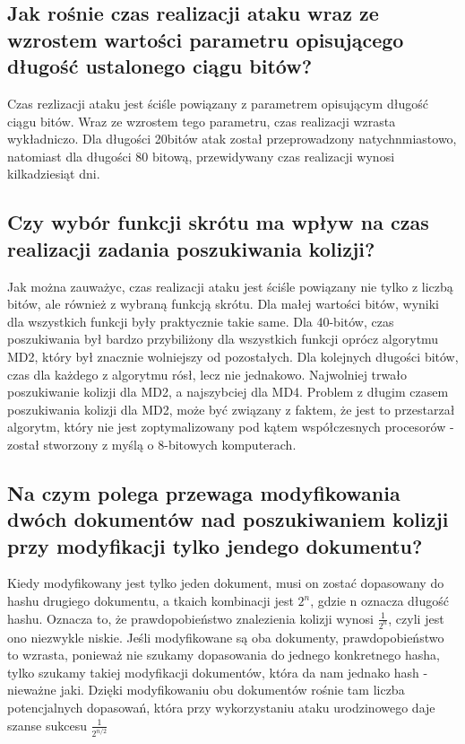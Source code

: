 \documentclass{article}
\begin{document}
\subsection{Jak rośnie czas realizacji ataku wraz ze wzrostem wartości parametru opisującego długość ustalonego ciągu bitów?}
Czas rezlizacji ataku jest ściśle powiązany z parametrem opisującym długość ciągu bitów. Wraz ze wzrostem tego parametru,
czas realizacji wzrasta wykładniczo. Dla długości 20bitów atak został przeprowadzony natychnmiastowo, natomiast dla długości 80 bitową, przewidywany czas realizacji wynosi kilkadziesiąt dni.
\subsection{Czy wybór funkcji skrótu ma wpływ na czas realizacji zadania poszukiwania kolizji?}
Jak można zauważyc, czas realizacji ataku jest ściśle powiązany nie tylko z liczbą bitów, ale również z wybraną funkcją skrótu. Dla małej wartości bitów, wyniki dla wszystkich funkcji były praktycznie takie same.
Dla 40-bitów, czas poszukiwania był bardzo przybiliżony dla wszystkich funkcji oprócz algorytmu MD2, który był znacznie wolniejszy od pozostałych. Dla kolejnych długości bitów, czas dla każdego z algorytmu
rósł, lecz nie jednakowo. Najwolniej trwało poszukiwanie kolizji dla MD2, a najszybciej dla MD4. Problem z długim czasem poszukiwania kolizji dla MD2, może być związany z faktem, że jest to przestarzał algorytm,
który nie jest zoptymalizowany pod kątem współczesnych procesorów - został stworzony z myślą o 8-bitowych komputerach.
\subsection{Na czym polega przewaga modyfikowania dwóch dokumentów nad poszukiwaniem kolizji przy modyfikacji tylko jendego dokumentu?}
Kiedy modyfikowany jest tylko jeden dokument, musi on zostać dopasowany do hashu drugiego dokumentu, a tkaich kombinacji jest \(2^{n}\), gdzie n oznacza długość hashu. Oznacza to, że prawdopobieństwo znalezienia kolizji wynosi
\(\frac{1}{2^{n}}\), czyli jest ono niezwykle niskie. Jeśli modyfikowane są oba dokumenty, prawdopobieństwo to wzrasta, ponieważ nie szukamy dopasowania do jednego konkretnego hasha, tylko szukamy takiej modyfikacji dokumentów, która da nam jednako hash - nieważne jaki.
Dzięki modyfikowaniu obu dokumentów rośnie tam liczba potencjalnych dopasowań, która przy wykorzystaniu ataku urodzinowego daje szanse sukcesu \(\frac{1}{2^{n/2}}\)
\end{document}
